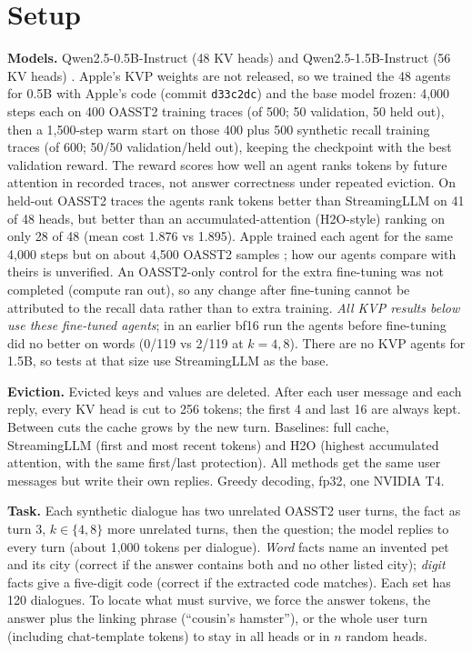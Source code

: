 \documentclass[11pt,a4paper]{article}
\begin{document}
\section{Setup}

\textbf{Models.} Qwen2.5-0.5B-Instruct (48 KV heads) and Qwen2.5-1.5B-Instruct (56 KV heads) \cite{qwen25}. Apple's KVP weights are not released, so we trained the 48 agents for 0.5B with Apple's code (commit \texttt{d33c2dc}) and the base model frozen: 4,000 steps each on 400 OASST2 \cite{oasst} training traces (of 500; 50 validation, 50 held out), then a 1,500-step warm start on those 400 plus 500 synthetic recall training traces (of 600; 50/50 validation/held out), keeping the checkpoint with the best validation reward. The reward scores how well an agent ranks tokens by future attention in recorded traces, not answer correctness under repeated eviction. On held-out OASST2 traces the agents rank tokens better than StreamingLLM on 41 of 48 heads, but better than an accumulated-attention (H2O-style) ranking on only 28 of 48 (mean cost 1.876 vs 1.895). Apple trained each agent for the same 4,000 steps but on about 4,500 OASST2 samples \cite{kvp}; how our agents compare with theirs is unverified. An OASST2-only control for the extra fine-tuning was not completed (compute ran out), so any change after fine-tuning cannot be attributed to the recall data rather than to extra training. \emph{All KVP results below use these fine-tuned agents}; in an earlier bf16 run the agents before fine-tuning did no better on words (0/119 vs 2/119 at $k = 4, 8$). There are no KVP agents for 1.5B, so tests at that size use StreamingLLM as the base.

\textbf{Eviction.} Evicted keys and values are deleted. After each user message and each reply, every KV head is cut to 256 tokens; the first 4 and last 16 are always kept. Between cuts the cache grows by the new turn. Baselines: full cache, StreamingLLM \cite{streamingllm} (first and most recent tokens) and H2O \cite{h2o} (highest accumulated attention, with the same first/last protection). All methods get the same user messages but write their own replies. Greedy decoding, fp32, one NVIDIA T4.

\textbf{Task.} Each synthetic dialogue has two unrelated OASST2 user turns, the fact as turn 3, $k \in \{4, 8\}$ more unrelated turns, then the question; the model replies to every turn (about 1,000 tokens per dialogue). \emph{Word} facts name an invented pet and its city (correct if the answer contains both and no other listed city); \emph{digit} facts give a five-digit code (correct if the extracted code matches). Each set has 120 dialogues. To locate what must survive, we force the answer tokens, the answer plus the linking phrase (``cousin's hamster''), or the whole user turn (including chat-template tokens) to stay in all heads or in $n$ random heads.
\end{document}
